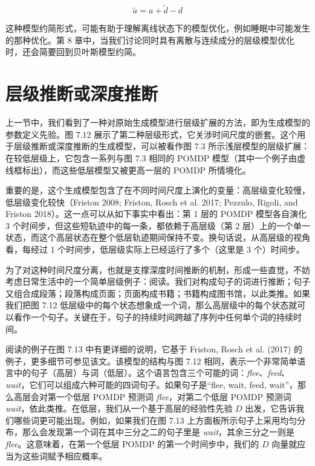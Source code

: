 \begin{equation}
\tilde{a}=a+\tilde{d}-d
\end{equation}

这种模型约简形式，可能有助于理解离线状态下的模型优化，例如睡眠中可能发生的那种优化。第 8 章中，当我们讨论同时具有离散与连续成分的层级模型优化时，还会简要回到贝叶斯模型约简。

\section{层级推断或深度推断}

上一节中，我们看到了一种对原始生成模型进行层级扩展的方法，即为生成模型的参数定义先验。图 7.12 展示了第二种层级形式，它关涉时间尺度的嵌套。这个用于层级推断或深度推断的生成模型，可以被看作图 7.3 所示浅层模型的层级扩展：在较低层级上，它包含一系列与图 7.3 相同的 POMDP 模型（其中一个例子由虚线框标出），而这些低层模型又被更高一层的 POMDP 所情境化。

重要的是，这个生成模型包含了在不同时间尺度上演化的变量：高层级变化较慢，低层级变化较快（Friston 2008; Friston, Rosch et al. 2017; Pezzulo, Rigoli, and Friston 2018）。这一点可以从如下事实中看出：第 1 层的 POMDP 模型各自演化 3 个时间步，但这些短轨迹中的每一条，都依赖于高层级（第 2 层）上的一个单一状态，而这个高层状态在整个低层轨迹期间保持不变。换句话说，从高层级的视角看，每经过 1 个时间步，低层级实际上已经运行了多个（这里是 3 个）时间步。

为了对这种时间尺度分离，也就是支撑深度时间推断的机制，形成一些直觉，不妨考虑日常生活中的一个简单层级例子：阅读。我们对构成句子的词进行推断；句子又组合成段落；段落构成页面；页面构成书籍；书籍构成图书馆，以此类推。如果我们把图 7.12 低层级中的每个状态想象成一个词，那么高层级中的每个状态就可以看作一个句子。关键在于，句子的持续时间跨越了序列中任何单个词的持续时间。

阅读的例子在图 7.13 中有更详细的说明，它基于 Friston, Rosch et al. (2017) 的例子，更多细节可参见该文。该模型的结构与图 7.12 相同，表示一个非常简单语言中的句子（高层）与词（低层）。这个语言包含三个可能的词：\emph{flee}、\emph{feed}、\emph{wait}，它们可以组成六种可能的四词句子。如果句子是“flee, wait, feed, wait”，那么高层会对第一个低层 POMDP 预测词 \emph{flee}，对第二个低层 POMDP 预测词 \emph{wait}，依此类推。在低层，我们从一个基于高层的经验性先验 $D$ 出发，它告诉我们哪些词更可能出现。例如，如果我们在图 7.13 上方面板所示句子上采用均匀分布，那么会发现第一个词在其中三分之二的句子里是 \emph{wait}，其余三分之一则是 \emph{flee}。这意味着，在第一个低层 POMDP 的第一个时间步中，我们的 $D$ 向量就应当为这些词赋予相应概率。

